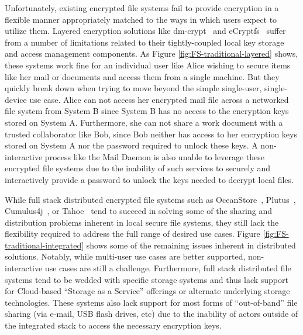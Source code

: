Unfortunately, existing encrypted file systems fail to provide
encryption in a flexible manner appropriately matched to the ways in
which users expect to utilize them. Layered encryption solutions like
dm-crypt~\cite{dm-crypt} and eCryptfs~\cite{eCryptfs, Halcrow} suffer
from a number of limitations related to their tightly-coupled local
key storage and access management components. As Figure
\ref{fig:FS-traditional-layered} shows, these systems work fine for an
individual user like Alice wishing to secure items like her mail or
documents and access them from a single machine. But they quickly
break down when trying to move beyond the simple single-user,
single-device use case. Alice can not access her encrypted mail file
across a networked file system from System B since System B has no
access to the encryption keys stored on System A. Furthermore, she can
not share a work document with a trusted collaborator like Bob, since
Bob neither has access to her encryption keys stored on System A nor
the password required to unlock these keys. A non-interactive process
like the Mail Daemon is also unable to leverage these encrypted file
systems due to the inability of such services to securely and
interactively provide a password to unlock the keys needed to decrypt
local files.

While full stack distributed encrypted file systems such as
OceanStore~\cite{Kubiatowicz2000}, Plutus~\cite{Kallahalla2003},
Cumulus4j~\cite{cumulus4j}, or Tahoe~\cite{Wilcox-O'Hearn2008} tend to
succeed in solving some of the sharing and distribution problems
inherent in local secure file systems, they still lack the flexibility
required to address the full range of desired use cases. Figure
\ref{fig:FS-traditional-integrated} shows some of the remaining issues
inherent in distributed solutions. Notably, while multi-user use cases
are better supported, non-interactive use cases are still a
challenge. Furthermore, full stack distributed file systems tend to be
wedded with specific storage systems and thus lack support for
Cloud-based ``Storage as a Service'' offerings or alternate underlying
storage technologies. These systems also lack support for most forms
of ``out-of-band'' file sharing (via e-mail, USB flash drives, etc)
due to the inability of actors outside of the integrated stack to
access the necessary encryption keys.

